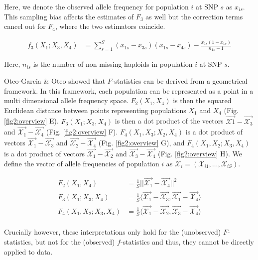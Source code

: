 \documentclass[12pt, letterpaper]{article}
\newcommand{\CX}{\mathcal{X}}
\begin{document}
Here, we denote the observed allele frequency for population $i$ at SNP $s$ as $x_{is}$. This sampling bias affects the estimates of $F_3$ as well but the correction terms cancel out for $F_4$, where the two estimators coincide.

\begin{align}\label{eq:f3_correction}
f_3(X_1;X_3,X_4) &= \sum_{s=1}^S(x_{1s} - x_{3s})(x_{1s} - x_{4s}) - \frac{x_{1s}(1-x_{1s})}{n_{1s}-1}
\end{align}\label{eq:f3_error}

Here, $n_{is}$ is the number of non-missing haploids in population $i$ at SNP $s$. 

Oteo-Garcia \& Oteo \cite{oteo-garcia_geometrical_2021} showed that $F$-statistics can be derived from a geometrical framework. In this framework, each population can be represented as a point in a multi dimensional allele frequency space. $F_2(X_1, X_4)$ is then the  squared Euclidean distance between points representing populations $X_1$ and $X_4$ (Fig. \ref{fig2:overview} E). $F_3(X_1;X_3,X_4)$ is then a dot product of the vectors $\Vec{\CX1} - \Vec{\CX_3}$ and $\Vec{\CX_1} - \Vec{\CX_4}$ (Fig. \ref{fig2:overview} F). $F_4(X_1,X_3;X_2,X_4)$ is a dot product of vectors $\Vec{\CX_1} - \Vec{\CX_3}$ and $\Vec{\CX_2} - \Vec{\CX_4}$ (Fig. \ref{fig2:overview} G), and $F_4(X_1,X_2;X_3,X_4)$ is a dot product of vectors $\Vec{\CX_1} - \Vec{\CX_2}$ and $\Vec{\CX_3} - \Vec{\CX_4}$ (Fig. \ref{fig2:overview} H).  We define the vector of allele frequencies of population $i$ as $\mathcal{X}_i = (\mathcal{X}_{i1}, \dots, \mathcal{X}_{iS})$. 

\begin{align}\label{eq:f_geometric}
F_2(X_1,X_4) &= \frac{1}{S}||\Vec{\mathcal{X}_{1}} - \vec{\mathcal{X}_{4}}||^2\nonumber\\
F_3(X_1;X_3,X_4) &= \frac{1}{S} \langle\vec{\mathcal{X}_{1}} - \vec{\mathcal{X}_{3}},\vec{\mathcal{X}_{1}} - \vec{\mathcal{X}_{4}}\rangle\nonumber\\
F_4(X_1,X_2;X_3,X_4) &= \frac{1}{S}\langle\vec{\mathcal{X}_{1}} - \vec{\mathcal{X}_{2}},\vec{\mathcal{X}_{3}} - \vec{\mathcal{X}_{4}}\rangle\nonumber\\
\end{align}

Crucially however, these interpretations only hold for the (unobserved) $F$-statistics, but not for the (observed) $f$-statistics and thus, they cannot be directly applied to data.
\end{document}
